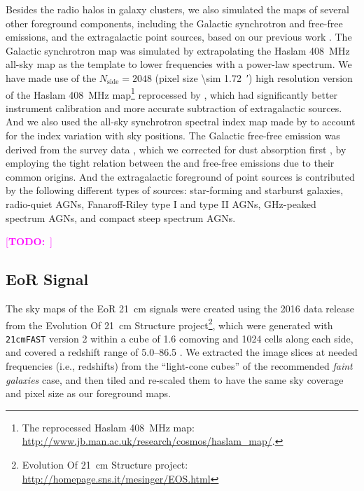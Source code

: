 \documentclass[modern]{aastex62}
\newcommand{\R}[1]{\mathrm{#1}}
\newcommand{\Halpha}{\text{H$\alpha$}}
\newcommand{\TODO}[1]{\textcolor{magenta}{[\textbf{TODO:}~\uuline{#1}]}}
\begin{document}
Besides the radio halos in galaxy clusters, we also simulated the maps of
several other foreground components, including the Galactic synchrotron
and free-free emissions, and the extragalactic point sources,
based on our previous work \citep[and references therein]{wang2010}.
The Galactic synchrotron map was simulated by extrapolating the
Haslam \SI{408}{\MHz} all-sky map as the template to lower frequencies
with a power-law spectrum.
We have made use of the $N_{\R{side}} = 2048$ (pixel size \SI{\sim 1.72}{\arcmin})
high resolution version of the Haslam \SI{408}{\MHz} map\footnote{%
  The reprocessed Haslam \SI{408}{\MHz} map:
  \url{http://www.jb.man.ac.uk/research/cosmos/haslam_map/}.
}
reprocessed by \citet{remazeilles2015}, which had significantly better
instrument calibration and more accurate subtraction of extragalactic
sources.
And we also used the all-sky synchrotron spectral index map made by
\citet{giardino2002} to account for the index variation with sky positions.
The Galactic free-free emission was derived from the \Halpha{} survey data
\citep{finkbeiner2003}, which we corrected for dust absorption first
\citep{dickinson2003}, by employing the tight relation between the \Halpha{}
and free-free emissions due to their common origins.
And the extragalactic foreground of point sources is contributed by the
following different types of sources: star-forming and starburst galaxies,
radio-quiet AGNs, Fanaroff-Riley type I and type II AGNs, GHz-peaked
spectrum AGNs, and compact steep spectrum AGNs.

\TODO{figures ...}


\subsection{EoR Signal}
\label{sec:eor-signal}

The sky maps of the EoR 21~cm signals were created using the 2016
data release from the Evolution Of 21~cm Structure project\footnote{%
  Evolution Of 21~cm Structure project:
  \url{http://homepage.sns.it/mesinger/EOS.html}},
which were generated with \texttt{21cmFAST} version 2 \citep{mesinger2011}
within a cube of 1.6 comoving \si{\Gpc} and 1024 cells along each side,
and covered a redshift range of \numrange{5.0}{86.5} \citep{mesinger2016}.
We extracted the image slices at needed frequencies (i.e., redshifts) from
the \enquote{light-cone cubes} of the recommended \emph{faint galaxies} case,
and then tiled and re-scaled them to have the same sky coverage and pixel
size as our foreground maps.
\end{document}
